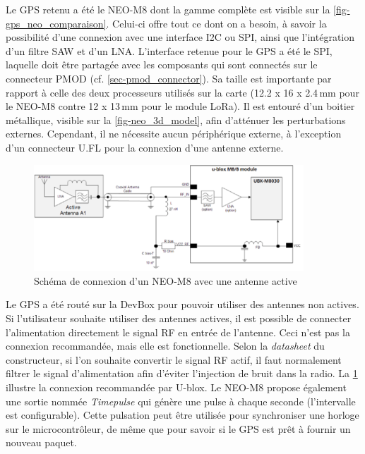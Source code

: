 Le GPS retenu a été le NEO-M8 dont la gamme complète est visible sur la \cref{fig-gps_neo_comparaison}. Celui-ci offre tout ce dont on a besoin, à savoir la possibilité d'une connexion avec une interface I2C ou SPI, ainsi que l'intégration d'un filtre SAW et d'un LNA. L'interface retenue pour le GPS a été le SPI, laquelle doit être partagée avec les composants qui sont connectés sur le connecteur PMOD (cf. \cref{sec-pmod_connector}). Sa taille est importante par rapport à celle des deux processeurs utilisés sur la carte (12.2 x 16 x 2.4\,mm pour le NEO-M8 contre 12 x 13\,mm pour le module LoRa). Il est entouré d'un boitier métallique, visible sur la \cref{fig-neo_3d_model}, afin d'atténuer les perturbations externes. Cependant, il ne nécessite aucun périphérique externe, à l'exception d'un connecteur U.FL pour la connexion d'une antenne externe.

\begin{figure}[ht!]
    \centering
    \includegraphics[width=0.9\textwidth]{Figures/Hardware/gps_neo_active_antenna.PNG}
    \caption{Schéma de connexion d'un NEO-M8 avec une antenne active}
    \label{fig-gps_neo_active_antenna}
\end{figure}

Le GPS a été routé sur la DevBox pour pouvoir utiliser des antennes non actives. Si l'utilisateur souhaite utiliser des antennes actives, il est possible de connecter l'alimentation directement le signal RF en entrée de l'antenne. Ceci n'est pas la connexion recommandée, mais elle est fonctionnelle. Selon la \textit{datasheet} du constructeur, si l'on souhaite convertir le signal RF actif, il faut normalement filtrer le signal d'alimentation afin d'éviter l'injection de bruit dans la radio. La \cref{fig-gps_neo_active_antenna} illustre la connexion recommandée par U-blox. Le NEO-M8 propose également une sortie nommée \textit{Timepulse} qui génère une pulse à chaque seconde (l'intervalle est configurable). Cette pulsation peut être utilisée pour synchroniser une horloge sur le microcontrôleur, de même que pour savoir si le GPS est prêt à fournir un nouveau paquet.\\

